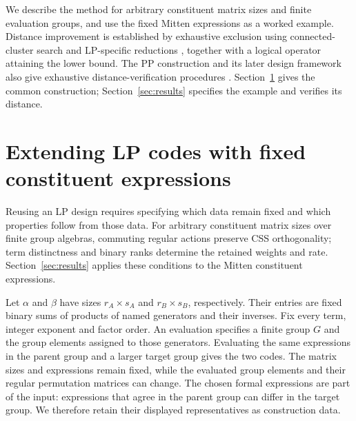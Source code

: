\documentclass[12pt]{article}
\begin{document}
We describe the method for arbitrary constituent matrix sizes and finite
evaluation groups, and use the fixed Mitten expressions as a worked example.
Distance improvement is established by exhaustive exclusion using
connected-cluster search \cite{clusters} and LP-specific reductions
\cite[Sec.~3.6]{qedist}, together with a logical operator attaining the
lower bound. The PP construction and its later design framework also give
exhaustive distance-verification procedures \cite{pp,design}.
Section~\ref{sec:construction} gives the common construction;
Section~\ref{sec:results} specifies the example and verifies its distance.

\section{Extending LP codes with fixed constituent expressions}\label{sec:construction}
Reusing an LP design requires specifying which data remain fixed and
which properties follow from those data. For arbitrary constituent matrix
sizes over finite group algebras, commuting regular actions preserve CSS
orthogonality; term distinctness and binary ranks determine the retained
weights and rate. Section~\ref{sec:results} applies these conditions to
the Mitten constituent expressions.

Let $\alpha$ and $\beta$ have sizes $r_A\times s_A$ and
$r_B\times s_B$, respectively. Their entries are fixed binary sums of
products of named generators and their inverses. Fix every term, integer
exponent and factor order. An evaluation specifies a finite group $G$ and
the group elements assigned to those generators. Evaluating the same
expressions in the parent group and a larger target group gives the two
codes. The matrix sizes and expressions remain fixed, while the evaluated
group elements and their regular permutation matrices can change.
The chosen formal expressions are part of the input: expressions that
agree in the parent group can differ in the target group. We therefore
retain their displayed representatives as construction data.
\end{document}
